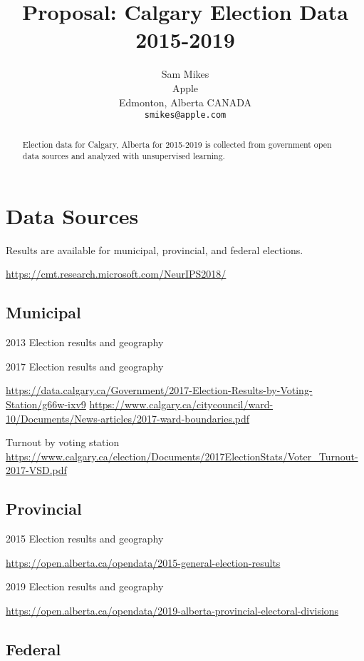 \documentclass{article}
\title{Proposal: Calgary Election Data 2015-2019}
\author{%
  Sam Mikes \\
  Apple\\
  Edmonton, Alberta CANADA \\
  \texttt{smikes@apple.com} \\
}
\begin{document}
\maketitle

\begin{abstract}
  Election data for Calgary, Alberta for 2015-2019 is collected
  from government open data sources and analyzed with unsupervised
  learning.
\end{abstract}

\section{Data Sources}

Results are available for municipal, provincial, and federal elections.

\begin{center}
  \url{https://cmt.research.microsoft.com/NeurIPS2018/}
\end{center}

\subsection{Municipal}

2013 Election results and geography

2017 Election results and geography

\url{https://data.calgary.ca/Government/2017-Election-Results-by-Voting-Station/g66w-ixv9}
\url{https://www.calgary.ca/citycouncil/ward-10/Documents/News-articles/2017-ward-boundaries.pdf}

Turnout by voting station
\url{https://www.calgary.ca/election/Documents/2017ElectionStats/Voter_Turnout-2017-VSD.pdf}

\subsection{Provincial}

2015 Election results and geography

\url{https://open.alberta.ca/opendata/2015-general-election-results}

2019 Election results and geography

\url{https://open.alberta.ca/opendata/2019-alberta-provincial-electoral-divisions}

\subsection{Federal}
\end{document}
